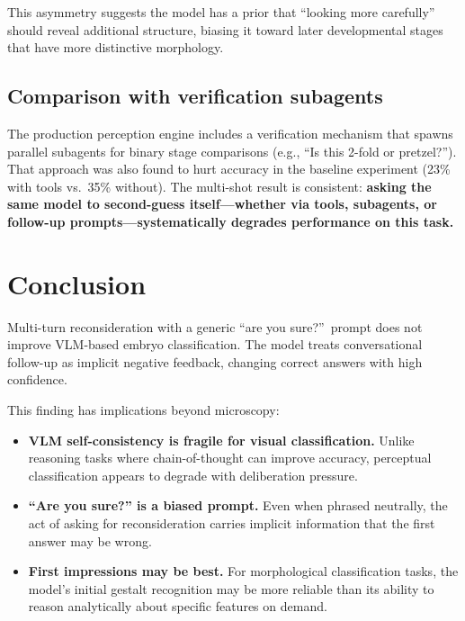 \documentclass[11pt, a4paper]{article}
\begin{document}
This asymmetry suggests the model has a prior that ``looking more carefully''
should reveal additional structure, biasing it toward later developmental stages
that have more distinctive morphology.

\subsection{Comparison with verification subagents}

The production perception engine includes a verification mechanism that spawns
parallel subagents for binary stage comparisons (e.g., ``Is this 2-fold or
pretzel?'').  That approach was also found to hurt accuracy in the baseline
experiment (23\% with tools vs.\ 35\% without).  The multi-shot result is
consistent: \textbf{asking the same model to second-guess itself---whether via
tools, subagents, or follow-up prompts---systematically degrades performance on
this task.}

\section{Conclusion}

Multi-turn reconsideration with a generic ``are you sure?''\ prompt does not
improve VLM-based embryo classification.  The model treats conversational
follow-up as implicit negative feedback, changing correct answers with high
confidence.

This finding has implications beyond microscopy:

\begin{itemize}[nosep]
  \item \textbf{VLM self-consistency is fragile for visual classification.}
    Unlike reasoning tasks where chain-of-thought can improve accuracy,
    perceptual classification appears to degrade with deliberation pressure.

  \item \textbf{``Are you sure?'' is a biased prompt.}  Even when phrased
    neutrally, the act of asking for reconsideration carries implicit
    information that the first answer may be wrong.

  \item \textbf{First impressions may be best.}  For morphological
    classification tasks, the model's initial gestalt recognition may be more
    reliable than its ability to reason analytically about specific features
    on demand.
\end{itemize}
\end{document}
